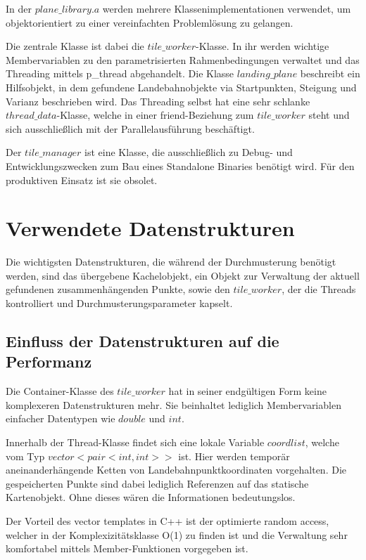 \documentclass[10pt,a4paper]{report}
\begin{document}
In der $plane\_library.a$ werden mehrere Klassenimplementationen verwendet, um objektorientiert zu einer vereinfachten Problemlösung zu gelangen.

Die zentrale Klasse ist dabei die $tile\_worker$-Klasse. In ihr werden wichtige Membervariablen zu den parametrisierten Rahmenbedingungen verwaltet und das Threading mittels p\_thread abgehandelt. Die Klasse $landing\_plane$ beschreibt ein Hilfsobjekt, in dem gefundene Landebahnobjekte via Startpunkten, Steigung und Varianz beschrieben wird.
Das Threading selbst hat eine sehr schlanke $thread\_data$-Klasse, welche in einer \glqq friend\grqq -Beziehung zum $tile\_worker$ steht und sich ausschließlich mit der Parallelausführung beschäftigt.

Der $tile\_manager$ ist eine Klasse, die ausschließlich zu Debug- und Entwicklungszwecken zum Bau eines Standalone Binaries benötigt wird.
Für den produktiven Einsatz ist sie obsolet.


\section{Verwendete Datenstrukturen}

Die wichtigsten Datenstrukturen, die während der Durchmusterung benötigt werden, sind das übergebene Kachelobjekt, ein Objekt zur Verwaltung der aktuell gefundenen zusammenhängenden Punkte, sowie den $tile\_worker$, der die Threads kontrolliert und Durchmusterungsparameter kapselt. 

\subsection{Einfluss der Datenstrukturen auf die Performanz}

Die Container-Klasse des $tile\_worker$ hat in seiner endgültigen Form keine komplexeren Datenstrukturen mehr. Sie beinhaltet lediglich Membervariablen einfacher Datentypen wie $double$ und $int$.

Innerhalb der Thread-Klasse findet sich eine lokale Variable $coordlist$, welche vom Typ $vector< pair<int,int> >$ ist.
Hier werden temporär aneinanderhängende Ketten von Landebahnpunktkoordinaten vorgehalten. Die gespeicherten Punkte sind dabei lediglich Referenzen auf das statische Kartenobjekt. Ohne dieses wären die Informationen bedeutungslos.

Der Vorteil des vector templates in C++ ist der optimierte random access, welcher in der Komplexizitätsklasse O(1) zu finden ist und die Verwaltung sehr komfortabel mittels Member-Funktionen vorgegeben ist.
\end{document}

